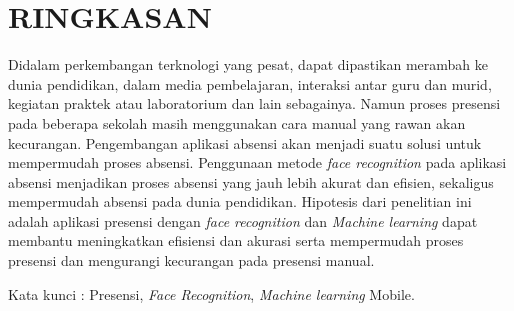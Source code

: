 \chapter*{RINGKASAN}
Didalam perkembangan terknologi yang pesat, dapat dipastikan merambah ke dunia pendidikan, dalam media pembelajaran, interaksi antar guru dan murid, kegiatan praktek atau laboratorium dan lain sebagainya. Namun proses presensi pada beberapa sekolah masih menggunakan cara manual yang rawan akan kecurangan. Pengembangan aplikasi absensi akan menjadi suatu solusi untuk mempermudah proses absensi. Penggunaan metode \emph{face recognition} pada aplikasi absensi menjadikan proses absensi yang jauh lebih akurat dan efisien, sekaligus mempermudah absensi pada dunia pendidikan. Hipotesis dari penelitian ini adalah aplikasi presensi dengan \emph{face recognition} dan \emph{Machine learning} dapat membantu meningkatkan efisiensi dan akurasi serta mempermudah proses presensi dan mengurangi kecurangan pada presensi manual.  %

Kata kunci : Presensi, \emph{Face Recognition}, \emph{Machine learning} Mobile.